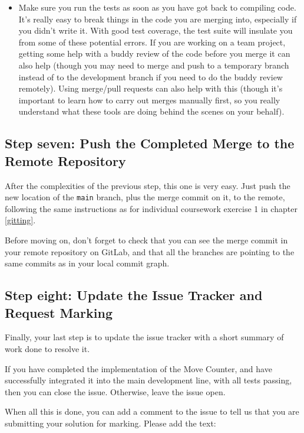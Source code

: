 \documentclass[
]{book}
\begin{document}
\begin{itemize}
\begin{itemize}
  \end{itemize}
\item
  Make sure you run the tests as soon as you have got back to compiling code. It's really easy to break things in the code you are merging into, especially if you didn't write it. With good test coverage, the test suite will insulate you from some of these potential errors. If you are working on a team project, getting some help with a buddy review of the code before you merge it can also help (though you may need to merge and push to a temporary branch instead of to the development branch if you need to do the buddy review remotely). Using merge/pull requests can also help with this (though it's important to learn how to carry out merges manually first, so you really understand what these tools are doing behind the scenes on your behalf).
\end{itemize}

\hypertarget{pushtoremote}{%
\subsection{Step seven: Push the Completed Merge to the Remote Repository}\label{pushtoremote}}

After the complexities of the previous step, this one is very easy. Just push the new location of the \texttt{main} branch, plus the merge commit on it, to the remote, following the same instructions as for individual coursework exercise 1 in chapter \ref{gitting}.

Before moving on, don't forget to check that you can see the merge commit in your remote repository on GitLab, and that all the branches are pointing to the same commits as in your local commit graph.

\hypertarget{requestm}{%
\subsection{Step eight: Update the Issue Tracker and Request Marking}\label{requestm}}

Finally, your last step is to update the issue tracker with a short summary of work done to resolve it.

If you have completed the implementation of the Move Counter, and have successfully integrated it into the main development line, with all tests passing, then you can close the issue. Otherwise, leave the issue open.

When all this is done, you can add a comment to the issue to tell us that you are submitting your solution for marking. Please add the text:
\end{document}
